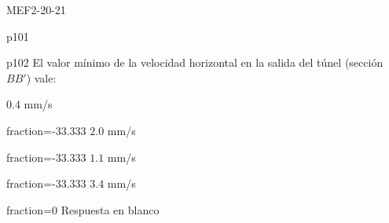 \documentclass[a4paper]{article}
\begin{document}
\begin{quiz}{MEF2-20-21}
\begin{multi}{p101}
\end{multi}
\begin{multi}{p102}
	El valor m\'inimo de la velocidad horizontal en la salida del t\'unel (secci\'on $BB'$) vale:
	\item* $0.4$ mm/s
	\item[fraction=-33.333] $2.0$ mm/s
	\item[fraction=-33.333] $1.1$ mm/s
	\item[fraction=-33.333] $3.4$ mm/s
	\item[fraction=0] Respuesta en blanco
\end{multi}




\end{quiz}
\end{document}
